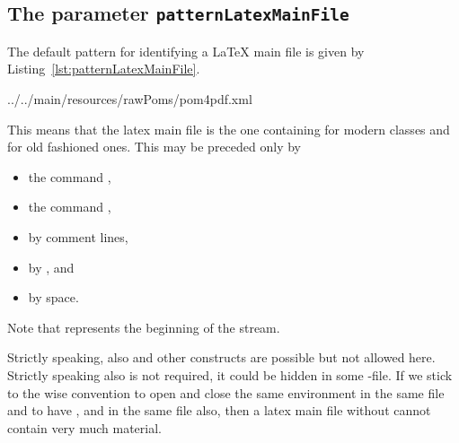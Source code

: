 \subsection{The parameter \texttt{patternLatexMainFile}}
\label{subsec:patternLatexMainFile}

The default pattern for identifying a \LaTeX{} main file is given by Listing~\ref{lst:patternLatexMainFile}.


{../../main/resources/rawPoms/pom4pdf.xml}%


This means that the latex main file is the one 
containing  for modern classes 
and  for old fashioned ones. 
This may be preceded only by 
%
\begin{itemize}
\item
the command , 
\item
the command , 
\item
by comment lines, 
\item
by , and 
\item
by space. 
\end{itemize}
%
Note that  represents the beginning of the stream. 

Strictly speaking, also  %
and other constructs are possible but not allowed here. 
Strictly speaking also  is not required, 
it could be hidden in some -file. 
If we stick to the wise convention to open and close the same environment 
in the same file and to have , 
 and  
in the same file also, 
then a latex main file without  
cannot contain very much material. 

